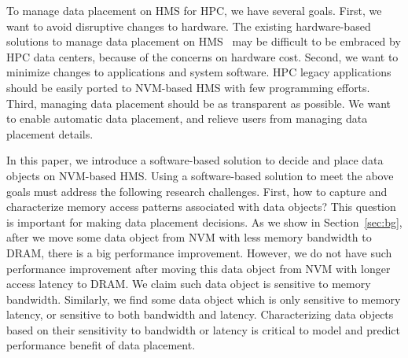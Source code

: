 To manage data placement on HMS for HPC, we have several goals.
First, we want to avoid disruptive changes to hardware. The existing hardware-based solutions to manage data placement on HMS~\cite{qureshi_micro09, ibm_isca09, gpu_pcm_pact13, row_buffer_pcm_iccd12} may be difficult to be embraced by
HPC data centers, because of the concerns on hardware cost.
Second, we want to minimize changes to applications and system software.
HPC legacy applications should be easily ported to NVM-based HMS
with few programming efforts.
Third, managing data placement should be as transparent as possible.
We want to enable automatic data placement, and relieve users from
managing data placement details.


In this paper, we introduce a software-based solution to decide
and place data objects on NVM-based HMS. Using a software-based solution
to meet the above goals must address the following research challenges. 
First, how to capture and characterize memory access patterns associated with data objects? This question is important for making data placement decisions.
As we show in Section~\ref{sec:bg},
after we move some data object from %
NVM with less memory bandwidth 
to DRAM, there is a big performance improvement.
However, we do not have such performance improvement after moving
this data object from NVM %
with longer access latency to DRAM.
We claim such data object is sensitive to memory bandwidth.
Similarly, we find some data object which is only sensitive to memory latency, or sensitive
to both bandwidth and latency. 
Characterizing data objects 
based on their sensitivity to bandwidth or latency
is critical to model and predict performance benefit of data placement. 

